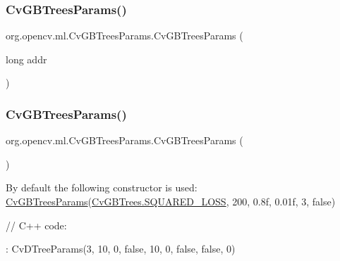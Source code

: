 \subsubsection{\texorpdfstring{Cv\+G\+B\+Trees\+Params()}{CvGBTreesParams()}\hspace{0.1cm}{\footnotesize\ttfamily [1/2]}}
{\footnotesize\ttfamily org.\+opencv.\+ml.\+Cv\+G\+B\+Trees\+Params.\+Cv\+G\+B\+Trees\+Params (\begin{DoxyParamCaption}\item[{long}]{addr }\end{DoxyParamCaption})\hspace{0.3cm}{\ttfamily [protected]}}

\mbox{\label{classorg_1_1opencv_1_1ml_1_1_cv_g_b_trees_params_a6322c0c66b392664076255036cecca37}} 
\subsubsection{\texorpdfstring{Cv\+G\+B\+Trees\+Params()}{CvGBTreesParams()}\hspace{0.1cm}{\footnotesize\ttfamily [2/2]}}
{\footnotesize\ttfamily org.\+opencv.\+ml.\+Cv\+G\+B\+Trees\+Params.\+Cv\+G\+B\+Trees\+Params (\begin{DoxyParamCaption}{ }\end{DoxyParamCaption})}

By default the following constructor is used\+: \mbox{\hyperlink{classorg_1_1opencv_1_1ml_1_1_cv_g_b_trees_params}{Cv\+G\+B\+Trees\+Params}}(\mbox{\hyperlink{classorg_1_1opencv_1_1ml_1_1_cv_g_b_trees_a2fa66daa8dd429f356068b3856b891fd}{Cv\+G\+B\+Trees.\+S\+Q\+U\+A\+R\+E\+D\+\_\+\+L\+O\+SS}}, 200, 0.\+8f, 0.\+01f, 3, false) {\ttfamily }

{\ttfamily }

{\ttfamily }

{\ttfamily // C++ code\+:}

{\ttfamily }

{\ttfamily }

{\ttfamily \+: Cv\+D\+Tree\+Params(3, 10, 0, false, 10, 0, false, false, 0)}


